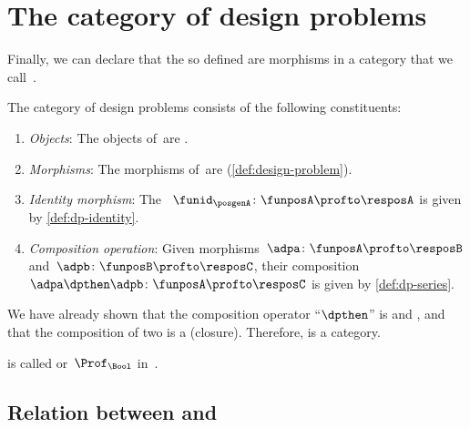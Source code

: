 
\section{The category of  design problems}  \DP

Finally, we can declare that the  so defined are morphisms in a category that we call~\DP.


\begin{definition}
    \label{def:DP}
    The category of design problems \DP consists of the following constituents:
    \begin{enumerate}
        \item \emph{Objects}: The objects of~\DP are .
        \item \emph{Morphisms}: The morphisms of~\DP are  (\cref{def:design-problem}).
        \item \emph{Identity morphism}: The ~$\funid_\posgenA \colon \funposA \profto \resposA$ is given by \cref{def:dp-identity}.
        \item \emph{Composition operation}: Given morphisms~$\adpa \colon  \funposA \profto \resposB$ and~$\adpb \colon \funposB \profto \resposC$, their composition~$\adpa \dpthen \adpb\colon \funposA\profto \resposC$ is given by \cref{def:dp-series}.
    \end{enumerate}
\end{definition}

We have already shown that the composition operator ``$\dpthen$'' is  and , and that the composition of two  is a  (closure).
Therefore, \DP is a category.

\DP is called \feas or~$\Prof_\Bool$ in~\cite{fong2019}.


\subsection{Relation between \DPI and \DP}

